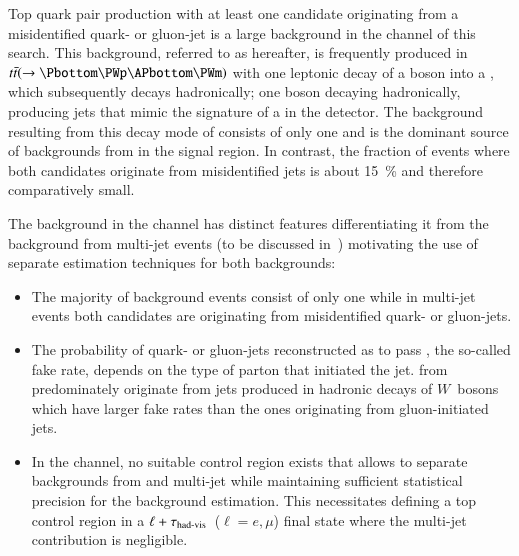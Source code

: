 
Top quark pair production with at least one \tauhadvis candidate
originating from a misidentified quark- or gluon-jet is a large
background in the \hadhad channel of this search. This background,
referred to as \ttbarFakes hereafter, is frequently produced in
$\ttbar(\ra \Pbottom \PWp \APbottom \PWm)$ with one leptonic decay of
a \PW boson into a \taulepton, which subsequently decays hadronically;
one \PW boson decaying hadronically, producing jets that mimic the
signature of a \tauhadvis in the detector. The \faketauhadvis
background resulting from this decay mode of \ttbar consists of only
one \faketauhadvis and is the dominant source of \faketauhadvis
backgrounds from \ttbar in the \hadhad signal region. In contrast, the
fraction of \ttbarFakes events where both \tauhadvis candidates
originate from misidentified jets is about \SI{15}{\percent} and
therefore comparatively small.

The \ttbarFakes background in the \hadhad channel has distinct
features differentiating it from the \faketauhadvis background from
multi-jet events (to be discussed in~)
motivating the use of separate estimation techniques for both
backgrounds:
\begin{itemize}
\item The majority of \ttbarFakes background events consist of only one
  \faketauhadvis while in multi-jet events both \tauhadvis candidates
  are originating from misidentified quark- or gluon-jets.

\item The probability of quark- or gluon-jets reconstructed as
  \tauhadvis to pass \tauid, the so-called fake rate, depends on the
  type of parton that initiated the jet. \Faketauhadvis from \ttbar
  predominately originate from jets produced in hadronic decays of
  $W$~bosons which have larger fake rates than the ones originating
  from gluon-initiated jets.

\item In the \hadhad channel, no suitable \ttbarFakes control region
  exists that allows to separate \faketauhadvis backgrounds from
  \ttbar and multi-jet while maintaining sufficient statistical
  precision for the background estimation. This necessitates defining
  a top control region in a $\ell + \tau_{\text{had-vis}}$~($\ell = e, \mu$)
  final state where the multi-jet contribution is negligible.
\end{itemize}

